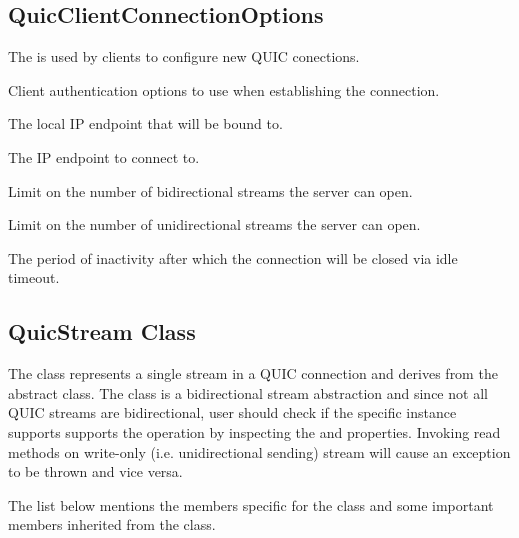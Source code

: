 \subsection{QuicClientConnectionOptions}

The  is used by clients to configure new QUIC conections.

\begin{description}

     Client authentication options to use when establishing the connection.

     The local IP endpoint that will be bound to.

     The IP endpoint to connect to.

     Limit on the number of bidirectional streams the server can open.

     Limit on the number of unidirectional streams the server can open.

     The period of inactivity after which the connection will be closed via idle timeout.

\end{description}

\subsection{QuicStream Class}

The \QuicStream{} class represents a single stream in a QUIC connection and derives from the
abstract  class. The  class is a bidirectional stream abstraction and
since not all QUIC streams are bidirectional, user should check if the specific \QuicStream{}
instance supports supports the operation by inspecting the  and 
properties. Invoking read methods on write-only (i.e. unidirectional sending) stream will cause an
exception to be thrown and vice versa.

The list below mentions the members specific for the  class and some important
members inherited from the  class.

